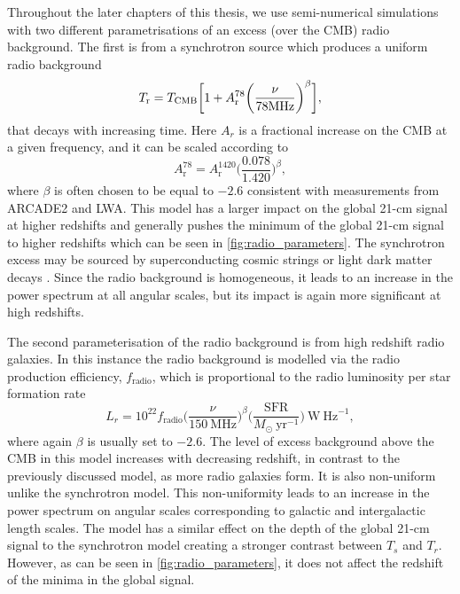 Throughout the later chapters of this thesis, we use semi-numerical simulations with two different parametrisations of an excess (over the CMB) radio background. The first is from a synchrotron source which produces a uniform radio background
\begin{equation}
    T_\mathrm{r} = T_\mathrm{CMB}\bigg[ 1 + A_{\mathrm{r}}^{78}\bigg(\frac{\nu}{78\textnormal{MHz}}\bigg)^\beta\bigg],
    \label{eq:srb_background}
\end{equation}
that decays with increasing time. Here $A_r$ is a fractional increase on the CMB at a given frequency, and it can be scaled according to
\begin{equation}
    A_{\mathrm{r}}^{78} = A_{\mathrm{r}}^{1420} \bigg(\frac{0.078}{1.420}\bigg)^\beta,
\end{equation}
where $\beta$ is often chosen to be equal to $-2.6$ consistent with measurements from ARCADE2 and LWA. This model has a larger impact on the global 21-cm signal at higher redshifts and generally pushes the minimum of the global 21-cm signal to higher redshifts which can be seen in \cref{fig:radio_parameters}. The synchrotron excess may be sourced by superconducting cosmic strings \cite{Brandenberger2019} or light dark matter decays \cite{Fraser2018, Pospelov2018}. Since the radio background is homogeneous, it leads to an increase in the power spectrum at all angular scales, but its impact is again more significant at high redshifts.

The second parameterisation of the radio background is from high redshift radio galaxies. In this instance the radio background is modelled via the radio production efficiency, $f_\mathrm{radio}$, which is proportional to the radio luminosity per star formation rate
\begin{equation}
L_r	= 10^{22} f_\mathrm{radio} \bigg(\frac{\nu}{150~\mathrm{MHz}}\bigg)^\beta \bigg(\frac{\mathrm{SFR}}{M_\odot~\mathrm{yr}^{-1}}\bigg)~\mathrm{W~Hz}^{-1},
\end{equation}
where again $\beta$ is usually set to $-2.6$. The level of excess background above the CMB in this model increases with decreasing redshift, in contrast to the previously discussed model, as more radio galaxies form. It is also non-uniform unlike the synchrotron model. This non-uniformity leads to an increase in the power spectrum on angular scales corresponding to galactic and intergalactic length scales. The model has a similar effect on the depth of the global 21-cm signal to the synchrotron model creating a stronger contrast between $T_s$ and $T_r$. However, as can be seen in \cref{fig:radio_parameters}, it does not affect the redshift of the minima in the global signal.

